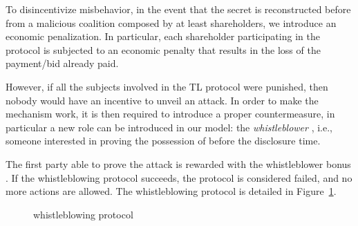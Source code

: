 To disincentivize misbehavior, in the event that the secret is reconstructed before \td from a malicious coalition composed by at least \K shareholders, we introduce an economic penalization. In particular, each shareholder participating in the protocol is subjected to an economic penalty that results in the loss of the payment/bid already paid.

However, if all the subjects involved in the TL protocol were punished, then nobody would have an incentive to unveil an attack.
In order to make the mechanism work, it is then required to introduce a proper countermeasure, in particular a new role can be introduced in our model: the {\em whistleblower} \whistleblower, i.e., someone interested in proving the possession of \secret before the disclosure time.

The first party able to prove the attack is rewarded with the whistleblower bonus \Wbonus. If the whistleblowing protocol succeeds, the \shortname protocol is considered failed, and no more actions are allowed.
%
The whistleblowing protocol is detailed in Figure~\ref{protocol:whistleblowing}.

\begin{figure}[t]
	\centering
	\caption{\shortname whistleblowing protocol}
	\label{protocol:whistleblowing}
\end{figure}
